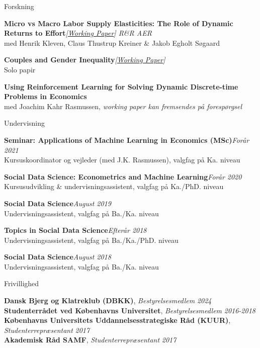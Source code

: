 \documentclass[
	11pt, %
]{resume} %
\begin{document}
\begin{rSection}{Forskning}

    \textbf{Micro vs Macro Labor Supply Elasticities: The Role of Dynamic Returns to Effort}\hfill \textit{[\href{https://www.nber.org/papers/w31549}{Working Paper}] R\&R AER} \\
    med Henrik Kleven, Claus Thustrup Kreiner \& Jakob Egholt Søgaard

    \textbf{Couples and Gender Inequality}\hfill \textit{[\href{https://ssrn.com/abstract=4697847}{Working Paper}]} \\
    Solo papir

    \textbf{Using Reinforcement Learning for Solving Dynamic Discrete-time Problems in Economics} \\
    med Joachim Kahr Rasmussen, \textit{working paper kan fremsendes på forespørgsel}
\end{rSection}


\begin{rSection}{Undervisning}

    \textbf{Seminar: Applications of Machine Learning in Economics (MSc)}\hfill \textit{Forår 2021} \\
    Kursuskoordinator og vejleder (med J.K. Rasmussen), valgfag på Ka. niveau

    \textbf{Social Data Science: Econometrics and Machine Learning}\hfill \textit{Forår 2020} \\
    Kursusudvikling \& undervisningsassistent, valgfag på Ka./PhD. niveau

    \textbf{Social Data Science}\hfill \textit{August 2019} \\
    Undervisningsassistent, valgfag på Ba./Ka. niveau

    \textbf{Topics in Social Data Science}\hfill \textit{Efterår 2018} \\
    Undervisningsassistent, valgfag på Ba./Ka./PhD. niveau

    \textbf{Social Data Science}\hfill \textit{August 2018} \\
    Undervisningsassistent, valgfag på Ba./Ka. niveau
\end{rSection}

\newpage

\begin{rSection}{Frivillighed}

    \textbf{Dansk Bjerg og Klatreklub (DBKK)}, \textit{Bestyrelsesmedlem} \hfill \textit{2024} \\
    \textbf{Studenterrådet ved Københavns Universitet}, \textit{Bestyrelsesmedlem} \hfill \textit{2016-2018} \\
    \textbf{Københavns Universitets Uddannelsesstrategiske Råd (KUUR)}, \textit{Studenterrepræsentant} \hfill \textit{2017} \\
    \textbf{Akademisk Råd SAMF}, \textit{Studenterrepræsentant} \hfill \textit{2017} \\

\end{rSection}
\end{document}
